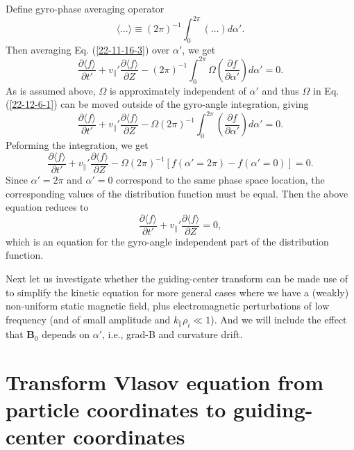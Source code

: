 \documentclass{llncs}
\begin{document}
Define gyro-phase averaging operator
\begin{equation}
  \langle \ldots \rangle \equiv (2 \pi)^{- 1} \int_0^{2 \pi} (\ldots) d
  \alpha' .
\end{equation}
Then averaging Eq. (\ref{22-11-16-3}) over $\alpha'$, we get
\begin{equation}
  \label{22-12-6-1} \frac{\partial \langle f \rangle}{\partial t'} +
  v_{\parallel}' \frac{\partial \langle f \rangle}{\partial Z} - (2 \pi)^{- 1}
  \int_0^{2 \pi} \Omega \left( \frac{\partial f}{\partial \alpha'} \right) d
  \alpha' = 0.
\end{equation}
As is assumed above, $\Omega$ is approximately independent of $\alpha'$ and
thus $\Omega$ in Eq. (\ref{22-12-6-1}) can be moved outside of the gyro-angle
integration, giving
\begin{equation}
  \frac{\partial \langle f \rangle}{\partial t'} + v_{\parallel}'
  \frac{\partial \langle f \rangle}{\partial Z} - \Omega (2 \pi)^{- 1}
  \int_0^{2 \pi} \left( \frac{\partial f}{\partial \alpha'} \right) d \alpha'
  = 0.
\end{equation}
Peforming the integration, we get
\begin{equation}
  \frac{\partial \langle f \rangle}{\partial t'} + v_{\parallel}'
  \frac{\partial \langle f \rangle}{\partial Z} - \Omega (2 \pi)^{- 1} [f
  (\alpha' = 2 \pi) - f (\alpha' = 0)] = 0.
\end{equation}
Since $\alpha' = 2 \pi$ and $\alpha' = 0$ correspond to the same phase space
location, the corresponding values of the distribution function must be equal.
Then the above equation reduces to
\begin{equation}
  \frac{\partial \langle f \rangle}{\partial t'} + v_{\parallel}'
  \frac{\partial \langle f \rangle}{\partial Z} = 0,
\end{equation}
which is an equation for the gyro-angle independent part of the distribution
function.

Next let us investigate whether the guiding-center transform can be made use
of to simplify the kinetic equation for more general cases where we have a
(weakly) non-uniform static magnetic field, plus electromagnetic perturbations
of low frequency (and of small amplitude and $k_{\parallel} \rho_i \ll 1$).
And we will include the effect that $\mathbf{B}_0$ depends on $\alpha'$, i.e.,
grad-B and curvature drift.

\section{Transform Vlasov equation from particle coordinates to guiding-center
coordinates}
\end{document}

